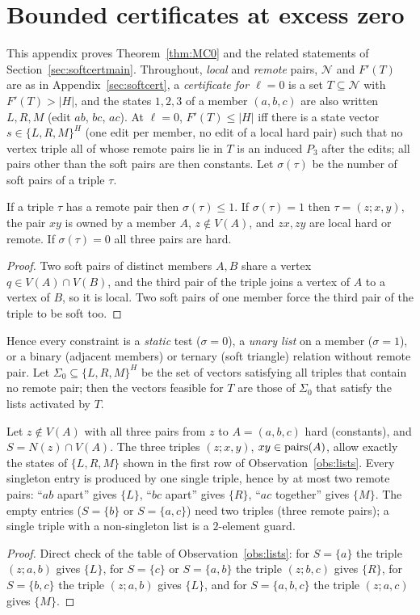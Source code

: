 \section{Bounded certificates at excess zero}\label{app:mc0}
This appendix proves Theorem~\ref{thm:MC0} and the related statements of Section~\ref{sec:softcertmain}. Throughout, \emph{local} and \emph{remote} pairs, $\mathcal N$ and $F'(T)$ are as in Appendix~\ref{sec:softcert}, a \emph{certificate for $\ell=0$} is a set $T\subseteq\mathcal N$ with $F'(T)>|H|$, and the states $1,2,3$ of a member $(a,b,c)$ are also written $L,R,M$ (edit $ab$, $bc$, $ac$). At $\ell=0$, $F'(T)\le|H|$ iff there is a state vector $s\in\{L,R,M\}^H$ (one edit per member, no edit of a local hard pair) such that no vertex triple all of whose remote pairs lie in $T$ is an induced $P_3$ after the edits; all pairs other than the soft pairs are then constants. Let $\sigma(\tau)$ be the number of soft pairs of a triple $\tau$.

\begin{lemma}\label{lem:mc1}
If a triple $\tau$ has a remote pair then $\sigma(\tau)\le1$. If $\sigma(\tau)=1$ then $\tau=(z;x,y)$, the pair $xy$ is owned by a member $A$, $z\notin V(A)$, and $zx,zy$ are local hard or remote. If $\sigma(\tau)=0$ all three pairs are hard.
\end{lemma}
\begin{proof}
Two soft pairs of distinct members $A,B$ share a vertex $q\in V(A)\cap V(B)$, and the third pair of the triple joins a vertex of $A$ to a vertex of $B$, so it is local. Two soft pairs of one member force the third pair of the triple to be soft too.
\end{proof}
Hence every constraint is a \emph{static} test ($\sigma=0$), a \emph{unary list} on a member ($\sigma=1$), or a binary (adjacent members) or ternary (soft triangle) relation without remote pair. Let $\Sigma_0\subseteq\{L,R,M\}^H$ be the set of vectors satisfying all triples that contain no remote pair; then the vectors feasible for $T$ are those of $\Sigma_0$ that satisfy the lists activated by $T$.

\begin{lemma}\label{lem:mc2}
Let $z\notin V(A)$ with all three pairs from $z$ to $A=(a,b,c)$ hard (constants), and $S=N(z)\cap V(A)$. The three triples $(z;x,y)$, $xy\in\mathrm{pairs}(A)$, allow exactly the states of $\{L,R,M\}$ shown in the first row of Observation~\ref{obs:lists}. Every singleton entry is produced by one single triple, hence by at most two remote pairs: ``$ab$ apart'' gives $\{L\}$, ``$bc$ apart'' gives $\{R\}$, ``$ac$ together'' gives $\{M\}$. The empty entries ($S=\{b\}$ or $S=\{a,c\}$) need two triples (three remote pairs); a single triple with a non-singleton list is a $2$-element guard.
\end{lemma}
\begin{proof}
Direct check of the table of Observation~\ref{obs:lists}: for $S=\{a\}$ the triple $(z;a,b)$ gives $\{L\}$, for $S=\{c\}$ or $S=\{a,b\}$ the triple $(z;b,c)$ gives $\{R\}$, for $S=\{b,c\}$ the triple $(z;a,b)$ gives $\{L\}$, and for $S=\{a,b,c\}$ the triple $(z;a,c)$ gives $\{M\}$.
\end{proof}

